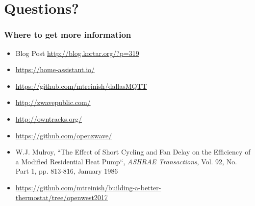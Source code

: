 \documentclass[aspectratio=169,11pt,hyperref={colorlinks=true}]{beamer}
\begin{document}
\section{Questions?}
\begin{frame}
\frametitle{Where to get more information}
    \begin{itemize}
        \item Blog Post \href{http://blog.kortar.org/?p=319}{http://blog.kortar.org/?p=319}
        \item \href{https://home-assistant.io/}{https://home-assistant.io/}
        \item \href{https://github.com/mtreinish/dallasMQTT}{https://github.com/mtreinish/dallasMQTT}
        \item \href{http://zwavepublic.com/}{http://zwavepublic.com/}
        \item \href{http://owntracks.org/}{http://owntracks.org/}
        \item \href{https://github.com/openzwave/}{https://github.com/openzwave/}
        \item W.J. Mulroy, ``The Effect of Short Cycling and Fan Delay on the Efficiency of a Modified Residential Heat Pump``, \textit{ASHRAE Transactions}, Vol. 92, No. Part 1, pp. 813-816, January 1986
        \item \href{https://github.com/mtreinish/building-a-better-thermostat/tree/openwest2017}{https://github.com/mtreinish/building-a-better-thermostat/tree/openwest2017}
    \end{itemize}
\end{frame}
\end{document}
